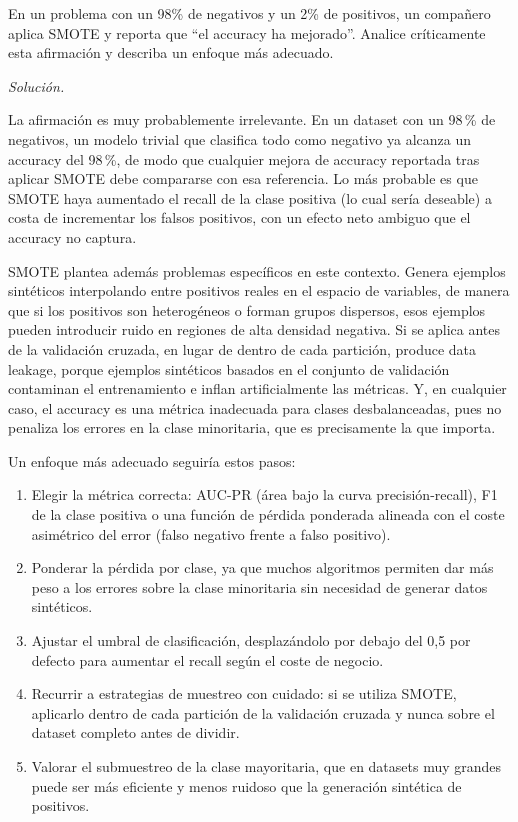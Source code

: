 \documentclass[12pt]{article}
\newcommand\sol[1]{\begin{mdframed}
\emph{Solución.} #1
\end{mdframed}}
\begin{document}
\begin{enumerate}
En un problema con un 98\% de negativos y un 2\% de positivos, un compañero aplica SMOTE y reporta
que ``el accuracy ha mejorado''. Analice críticamente esta afirmación y describa un enfoque más
adecuado.

\sol{

La afirmación es muy probablemente irrelevante. En un dataset con un 98\,\% de negativos, un modelo
trivial que clasifica todo como negativo ya alcanza un accuracy del 98\,\%, de modo que cualquier
mejora de accuracy reportada tras aplicar SMOTE debe compararse con esa referencia. Lo más probable es
que SMOTE haya aumentado el recall de la clase positiva (lo cual sería deseable) a costa de
incrementar los falsos positivos, con un efecto neto ambiguo que el accuracy no captura.

\medskip
SMOTE plantea además problemas específicos en este contexto. Genera ejemplos sintéticos interpolando
entre positivos reales en el espacio de variables, de manera que si los positivos son heterogéneos o
forman grupos dispersos, esos ejemplos pueden introducir ruido en regiones de alta densidad negativa.
Si se aplica antes de la validación cruzada, en lugar de dentro de cada partición, produce data
leakage, porque ejemplos sintéticos basados en el conjunto de validación contaminan el entrenamiento
e inflan artificialmente las métricas. Y, en cualquier caso, el accuracy es una métrica inadecuada
para clases desbalanceadas, pues no penaliza los errores en la clase minoritaria, que es precisamente
la que importa.

\medskip
Un enfoque más adecuado seguiría estos pasos:

\begin{enumerate}[1.]
  \item Elegir la métrica correcta: AUC-PR (área bajo la curva precisión-recall), F1 de la clase
  positiva o una función de pérdida ponderada alineada con el coste asimétrico del error (falso
  negativo frente a falso positivo).
  \item Ponderar la pérdida por clase, ya que muchos algoritmos permiten dar más peso a los errores
  sobre la clase minoritaria sin necesidad de generar datos sintéticos.
  \item Ajustar el umbral de clasificación, desplazándolo por debajo del 0{,}5 por defecto para
  aumentar el recall según el coste de negocio.
  \item Recurrir a estrategias de muestreo con cuidado: si se utiliza SMOTE, aplicarlo dentro de cada
  partición de la validación cruzada y nunca sobre el dataset completo antes de dividir.
  \item Valorar el submuestreo de la clase mayoritaria, que en datasets muy grandes puede ser más
  eficiente y menos ruidoso que la generación sintética de positivos.
\end{enumerate}
}


\end{enumerate}
\end{document}
